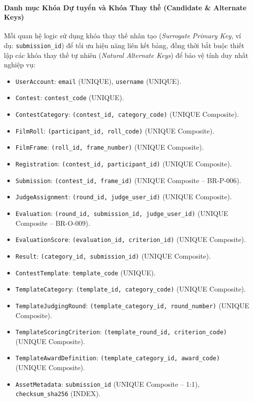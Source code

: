 \paragraph{Danh mục Khóa Dự tuyển và Khóa Thay thế (Candidate \& Alternate Keys)}
Mỗi quan hệ logic sử dụng khóa thay thế nhân tạo (\textit{Surrogate Primary Key}, ví dụ: \texttt{submission\_id}) để tối ưu hiệu năng liên kết bảng, đồng thời bắt buộc thiết lập các khóa thay thế tự nhiên (\textit{Natural Alternate Keys}) để bảo vệ tính duy nhất nghiệp vụ:
\begin{itemize}
    \item \texttt{UserAccount}: \texttt{email} (UNIQUE), \texttt{username} (UNIQUE).
    \item \texttt{Contest}: \texttt{contest\_code} (UNIQUE).
    \item \texttt{ContestCategory}: \texttt{(contest\_id, category\_code)} (UNIQUE Composite).
    \item \texttt{FilmRoll}: \texttt{(participant\_id, roll\_code)} (UNIQUE Composite).
    \item \texttt{FilmFrame}: \texttt{(roll\_id, frame\_number)} (UNIQUE Composite).
    \item \texttt{Registration}: \texttt{(contest\_id, participant\_id)} (UNIQUE Composite).
    \item \texttt{Submission}: \texttt{(contest\_id, frame\_id)} (UNIQUE Composite -- BR-P-006).
    \item \texttt{JudgeAssignment}: \texttt{(round\_id, judge\_user\_id)} (UNIQUE Composite).
    \item \texttt{Evaluation}: \texttt{(round\_id, submission\_id, judge\_user\_id)} (UNIQUE Composite -- BR-O-009).
    \item \texttt{EvaluationScore}: \texttt{(evaluation\_id, criterion\_id)} (UNIQUE Composite).
    \item \texttt{Result}: \texttt{(category\_id, submission\_id)} (UNIQUE Composite).
    \item \texttt{ContestTemplate}: \texttt{template\_code} (UNIQUE).
    \item \texttt{TemplateCategory}: \texttt{(template\_id, category\_code)} (UNIQUE Composite).
    \item \texttt{TemplateJudgingRound}: \texttt{(template\_category\_id, round\_number)} (UNIQUE Composite).
    \item \texttt{TemplateScoringCriterion}: \texttt{(template\_round\_id, criterion\_code)} (UNIQUE Composite).
    \item \texttt{TemplateAwardDefinition}: \texttt{(template\_category\_id, award\_code)} (UNIQUE Composite).
    \item \texttt{AssetMetadata}: \texttt{submission\_id} (UNIQUE Composite -- 1:1), \texttt{checksum\_sha256} (INDEX).
\end{itemize}

